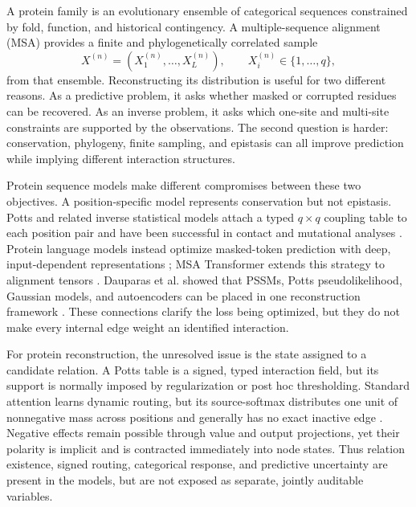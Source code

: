 \documentclass[10pt,twocolumn]{article}
\newcommand{\1}{\mathbf 1}
\theoremstyle{remark}
\begin{document}
A protein family is an evolutionary ensemble of categorical sequences constrained by fold,
function, and historical contingency.  A multiple-sequence alignment (MSA) provides a finite and
phylogenetically correlated sample
\begin{equation}
X^{(n)}=(X_1^{(n)},\ldots,X_L^{(n)}),
\qquad X_i^{(n)}\in\{1,\ldots,q\},
\label{eq:msa}
\end{equation}
from that ensemble.  Reconstructing its distribution is useful for two different reasons.  As a
predictive problem, it asks whether masked or corrupted residues can be recovered.  As an inverse
problem, it asks which one-site and multi-site constraints are supported by the observations.  The
second question is harder: conservation, phylogeny, finite sampling, and epistasis can all improve
prediction while implying different interaction structures.

Protein sequence models make different compromises between these two objectives.  A
position-specific model represents conservation but not epistasis.  Potts and related inverse
statistical models attach a typed $q\times q$ coupling table to each position pair and have been
successful in contact and mutational analyses \cite{morcos2011,ekeberg2013}.  Protein language
models instead optimize masked-token prediction with deep, input-dependent representations
\cite{rives2021}; MSA Transformer extends this strategy to alignment tensors \cite{rao2021}.
Dauparas et al. showed that PSSMs, Potts pseudolikelihood, Gaussian models, and autoencoders can be
placed in one reconstruction framework \cite{dauparas2019}.  These connections clarify the loss
being optimized, but they do not make every internal edge weight an identified interaction.

For protein reconstruction, the unresolved issue is the state assigned to a candidate relation.
A Potts table is a signed,
typed interaction field, but its support is normally imposed by regularization or post hoc
thresholding.  Standard attention learns dynamic routing, but its source-softmax distributes one
unit of nonnegative mass across positions and generally has no exact inactive edge
\cite{vaswani2017}.  Negative effects remain possible through value and output projections, yet
their polarity is implicit and is contracted immediately into node states.  Thus relation
existence, signed routing, categorical response, and predictive uncertainty are present in the
models, but are not exposed as separate, jointly auditable variables.
\end{document}
